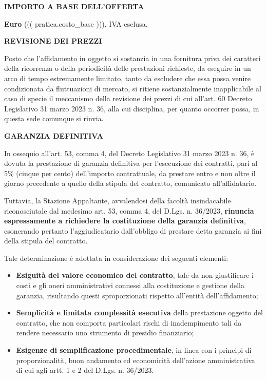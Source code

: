 \textbf{IMPORTO A BASE DELL'OFFERTA}

\textbf{Euro} ((( pratica.costo_base ))), IVA esclusa.

\textbf{REVISIONE DEI PREZZI}

Posto che l'affidamento in oggetto si sostanzia in una fornitura priva
dei caratteri della ricorrenza o della periodicità delle prestazioni
richieste, da eseguire in un arco di tempo estremamente limitato, tanto da
escludere che essa possa venire condizionata da fluttuazioni di mercato,
si ritiene sostanzialmente inapplicabile al caso di specie il meccanismo
della revisione dei prezzi di cui all'art. 60 Decreto Legislativo
31 marzo 2023 n. 36, alla cui disciplina, per quanto occorrer possa,
in questa sede comunque si rinvia.

\textbf{GARANZIA DEFINITIVA}

In ossequio all'art. 53, comma 4, del Decreto Legislativo 31 marzo 2023 
n. 36, \`e dovuta la prestazione di garanzia definitiva per l'esecuzione 
dei contratti, pari al 5\% (cinque per cento) dell'importo contrattuale, 
da prestare entro e non oltre il giorno precedente a quello della stipula 
del contratto, comunicato all'affidatario.

Tuttavia, la Stazione Appaltante, avvalendosi della facolt\`a insindacabile
riconosciutale dal medesimo art. 53, comma 4, del D.Lgs. n. 36/2023, 
\textbf{rinuncia espressamente a richiedere la costituzione della garanzia
definitiva}, esonerando pertanto l'aggiudicatario dall'obbligo di prestare
detta garanzia ai fini della stipula del contratto.

Tale determinazione è adottata in considerazione dei seguenti elementi:
\begin{itemize}
	\item
	\textbf{Esiguità del valore economico del contratto}, tale da non
	giustificare i costi e gli oneri amministrativi connessi alla
	costituzione e gestione della garanzia, risultando questi sproporzionati
	rispetto all'entità dell'affidamento;
	\item
	\textbf{Semplicità e limitata complessità esecutiva} della prestazione
	oggetto del contratto, che non comporta particolari rischi di inadempimento
	tali da rendere necessario uno strumento di presidio finanziario;
	\item
	\textbf{Esigenze di semplificazione procedimentale}, in linea con i
	principi di proporzionalit\`a, buon andamento ed economicit\`a dell'azione
	amministrativa di cui agli artt. 1 e 2 del D.Lgs. n. 36/2023.
\end{itemize}

